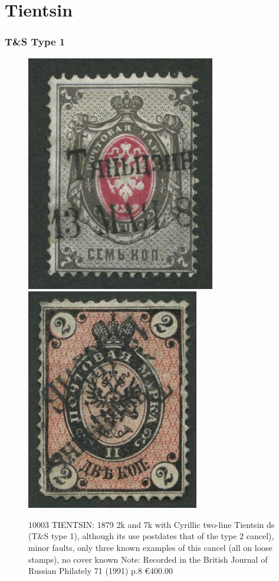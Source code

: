 \chapter{Tientsin} 

\subsection{T\&S Type 1}
\begin{figure}[htbp]
\centering
\includegraphics[width=.45\textwidth]{../russian-post-offices-in-china/10003.jpg}
\includegraphics[width=.45\textwidth]{../russian-post-offices-in-china/10003-1.jpg}
\caption{
10003	TIENTSIN: 1879 2k and 7k with Cyrillic two-line Tientsin ds (T\&S type 1),
although its use postdates that of the type 2 cancel), minor faults, only 
three known examples of this cancel (all on loose stamps), no cover known
Note: Recorded in the British Journal of Russian Philately 71 (1991) p.8
\euro 400.00
}  
\end{figure}

